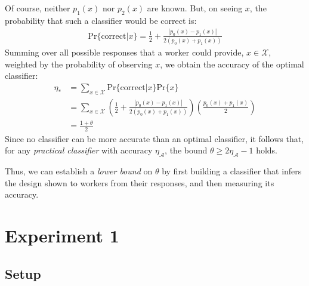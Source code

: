 \documentclass{sigchi}
\begin{document}
Of course, neither $p_1(x)$ nor $p_2(x)$ are known.  But, on seeing $x$,
the probability that such a classifier would be correct is:
\begin{align}
  \mathrm{Pr}\{\mathrm{correct}|x\} = \frac{1}{2} 
	+ \frac{|p_0(x) - p_1(x)|}{2(p_0(x) + p_1(x))}
\end{align}
Summing over all possible responses that a worker could provide, 
$x \in \mathcal{X}$, weighted by the probability of observing $x$, 
we obtain the accuracy of the optimal classifier:
\begin{align}
\eta_* 
  &= \sum_{x\in\mathcal{X}} 
	\mathrm{Pr}\{\mathrm{correct}|x\}\mathrm{Pr}\{x\} \\
  &= \sum_{x\in\mathcal{X}} 
	\left(
	\frac{1}{2} + \frac{|p_0(x) - p_1(x)|}{2(p_0(x) + p_1(x))}
  \right) \left( 
	\frac{p_0(x) + p_1(x)}{2} 
  \right) \\
  &= \frac{1 + \theta}{2}
\end{align}
Since no classifier can be more accurate than an optimal classifier,
it follows that, for any \textit{practical classifier} 
with accuracy $\eta_\mathcal{A}$, the bound 
$\theta \geq 2\eta_\mathcal{A} -1$ holds.

Thus, we can establish a \textit{lower bound} on $\theta$ by first 
building a classifier that infers the design shown to workers from their 
responses, and then measuring its accuracy.

\section{Experiment 1}
\subsection{Setup}
\end{document}
